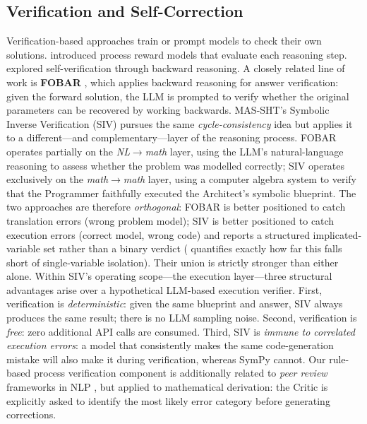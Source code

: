 \documentclass[11pt,a4paper]{article}
\begin{document}
\subsection{Verification and Self-Correction}
Verification-based approaches train or prompt models to check their own solutions.
\citet{lightman2023lets} introduced process reward models that evaluate each reasoning step.
\citet{weng2023large} explored self-verification through backward reasoning.
A closely related line of work is \textbf{FOBAR} \citep{jiang2024fobar}, which applies backward reasoning for answer verification: given the forward solution, the LLM is prompted to verify whether the original parameters can be recovered by working backwards.
MAS-SHT's Symbolic Inverse Verification (SIV) pursues the same \emph{cycle-consistency} idea but applies it to a different---and complementary---layer of the reasoning process.
FOBAR operates partially on the \emph{NL$\to$math} layer, using the LLM's natural-language reasoning to assess whether the problem was modelled correctly; SIV operates exclusively on the \emph{math$\to$math} layer, using a computer algebra system to verify that the Programmer faithfully executed the Architect's symbolic blueprint.
The two approaches are therefore \emph{orthogonal}: FOBAR is better positioned to catch translation errors (wrong problem model); SIV is better positioned to catch execution errors (correct model, wrong code) and reports a structured implicated-variable set rather than a binary verdict ( quantifies exactly how far this falls short of single-variable isolation).
Their union is strictly stronger than either alone.
Within SIV's operating scope---the execution layer---three structural advantages arise over a hypothetical LLM-based execution verifier.
First, verification is \emph{deterministic}: given the same blueprint and answer, SIV always produces the same result; there is no LLM sampling noise.
Second, verification is \emph{free}: zero additional API calls are consumed.
Third, SIV is \emph{immune to correlated execution errors}: a model that consistently makes the same code-generation mistake will also make it during verification, whereas SymPy cannot.
Our rule-based process verification component is additionally related to \emph{peer review} frameworks in NLP \citep{gero2023selfeval}, but applied to mathematical derivation: the Critic is explicitly asked to identify the most likely error category before generating corrections.
\end{document}
